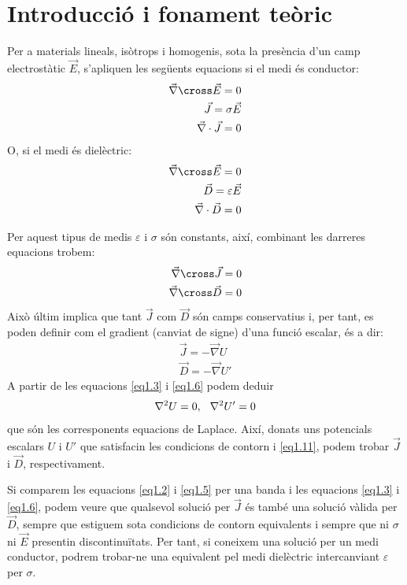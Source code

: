 \documentclass[a4paper,10.5pt]{report}
\begin{document}
\section{Introducció i fonament teòric}
Per a materials lineals, isòtrops i homogenis, sota la presència d'un camp electrostàtic $\vec{E}$, s'apliquen les següents equacions si el medi és conductor:
\begin{align}
	\vec{\nabla} \cross \vec{E} = 0 \\
	\vec{J} = \sigma \vec{E} \label{eq1.2}  \\ 
	\vec{\nabla}\cdot \vec{J} = 0 \label{eq1.3}
\end{align}
O, si el medi és dielèctric:
\begin{align}
	\vec{\nabla} \cross \vec{E} = 0 \\
	\vec{D} = \varepsilon \vec{E} \label{eq1.5} \\ 
	\vec{\nabla}\cdot \vec{D} = 0 \label{eq1.6}
\end{align}

Per aquest tipus de medis $\varepsilon$ i $\sigma$ són constants, així, combinant les darreres equacions trobem:
\begin{align}
	\vec{\nabla} \cross \vec{J} = 0 \\
	\vec{\nabla} \cross \vec{D} = 0
\end{align}
Això últim implica que tant $\vec{J}$ com $\vec{D}$ són camps conservatius i, per tant, es poden definir com el gradient (canviat de signe) d'una funció escalar, és a dir:
\begin{align}
	\vec{J} = -\vec{\nabla}{U} \\
	\vec{D} = -\vec{\nabla}{U'}
\end{align}
A partir de les equacions \eqref{eq1.3} i \eqref{eq1.6} podem deduir
\begin{equation}
	\nabla^2 U  = 0, \hspace{0.25cm} \nabla^2 U' = 0 \label{eq1.11}
\end{equation}
que són les corresponents equacions de Laplace. Així, donats uns potencials escalars $U$ i $U'$ que satisfacin les condicions de contorn i \eqref{eq1.11}, podem trobar $\vec{J}$ i $\vec{D}$, respectivament.

Si comparem les equacions \eqref{eq1.2} i \eqref{eq1.5} per una banda i les equacions \eqref{eq1.3} i \eqref{eq1.6}, podem veure que qualsevol solució per $\vec{J}$ és també una solució vàlida per $\vec{D}$, sempre que estiguem sota condicions de contorn equivalents i sempre que ni $\sigma$ ni $\vec{E}$ presentin discontinuïtats. Per tant, si coneixem una solució per un medi conductor, podrem trobar-ne una equivalent pel medi dielèctric intercanviant $\varepsilon$ per $\sigma$.
\end{document}
